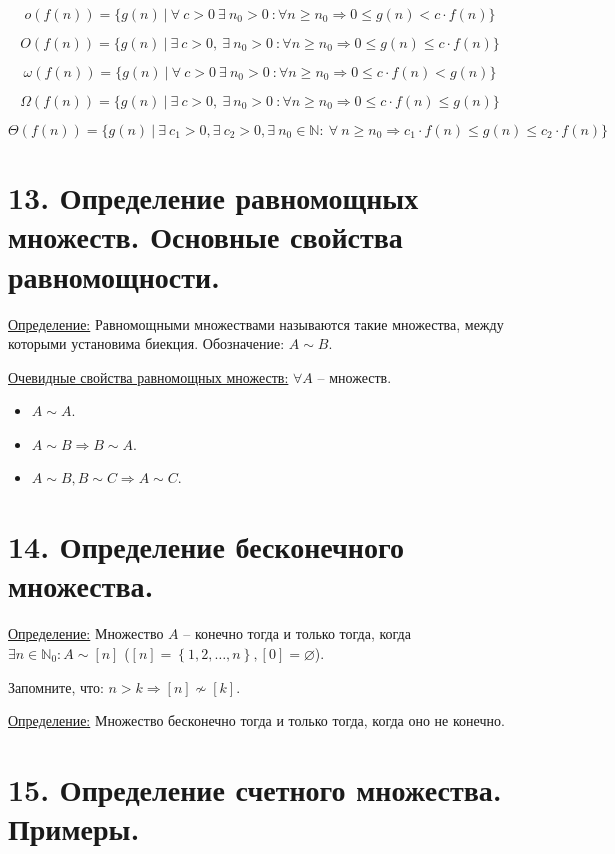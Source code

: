\documentclass[a4paper, 12pt]{article}
\newcommand{\definition}{\underline{Определение:} }
\newcommand{\N}{\mathbb{N}}
\begin{document}
    \[
        o(f(n)) = \{g(n) \ | \ \forall \ c > 0 \ \exists \ n_0 > 0 \ : \forall n \geq n_0 \Rightarrow 0 \leq g(n) < c \cdot f(n)\}
    \]

    \[
        O(f(n)) = \{g(n) \ | \ \exists \ c > 0, \ \exists \ n_0 > 0 \ : \forall n \geq n_0 \Rightarrow 0 \leq g(n) \leq c \cdot f(n)\}
    \]

    \[
        \omega(f(n)) = \{g(n) \ | \ \forall \ c > 0 \ \exists \ n_0 > 0 \ : \forall n \geq n_0 \Rightarrow 0 \leq c \cdot f(n) < g(n)\}
    \]

    \[
        \Omega(f(n)) = \{g(n) \ | \ \exists \ c > 0, \ \exists \ n_0 > 0 \ : \forall n \geq n_0 \Rightarrow 0 \leq c \cdot f(n) \leq g(n)\}
    \]

    \[
        \Theta(f(n)) = \{g(n) \ | \ \exists \ c_1 > 0, \exists \ c_2 > 0, \exists \ n_0 \in \N: \ \forall \ n \geq n_0 \Rightarrow c_1 \cdot f(n) \leq g(n) \leq c_2 \cdot f(n)\}
    \]

\section*{13. Определение равномощных множеств. Основные свойства равномощности.}

\definition Равномощными множествами называются такие множества,
между которыми установима биекция. Обозначение: $A \sim B$.

\underline{Очевидные свойства равномощных множеств:} $\forall A$ -- множеств.
\begin{itemize}
        \item $A \sim A$.
        \item $A \sim B \Rightarrow B \sim A$.
        \item $A \sim B, B \sim C \Rightarrow A \sim C$.
\end{itemize}


\section*{14. Определение бесконечного множества.}

\definition Множество $A$ -- конечно тогда и только тогда,
когда $\exists n \in \N_0: A \sim [n]$ ($[n] = \left\{ 1, 2, \ldots, n \right\}, [0] = \varnothing$).

Запомните, что: $n > k \Rightarrow [n] \nsim [k]$.

\definition Множество бесконечно тогда и только тогда, когда оно не конечно.

\section*{15. Определение счетного множества. Примеры.}
\end{document}
